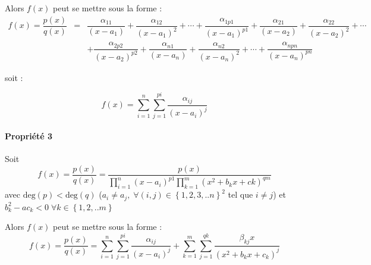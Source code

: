 \documentclass[10pt,fleqn]{article} %
\begin{document}
Alors $f(x)$ peut se mettre sous la forme :
$$
\begin{array}{lll}
f(x)=\dfrac{p(x)}{q(x)}&=&
\dfrac{\alpha_{11}}{\left(x-a_1 \right)}
+\dfrac{\alpha_{12}}{\left(x-a_1 \right)^2}
+\cdots
+\dfrac{\alpha_{1p1}}{\left(x-a_1 \right)^{p1}}
+\dfrac{\alpha_{21}}{\left(x-a_2 \right)}
+\dfrac{\alpha_{22}}{\left(x-a_2 \right)^{2}}
+\cdots \\
&&
+\dfrac{\alpha_{2p2}}{\left(x-a_2 \right)^{p2}}
+\dfrac{\alpha_{n1}}{\left(x-a_n \right)}
+\dfrac{\alpha_{n2}}{\left(x-a_n \right)^{2}}
+\cdots
+\dfrac{\alpha_{npn}}{\left(x-a_n \right)^{pn}}
\end{array}
$$

soit : 

$$
f(x)=\sum\limits_{i=1}^n \sum\limits_{j=1}^{pi}
\dfrac{\alpha_{ij}}{\left(x-a_i\right)^j}
$$
\paragraph*{Propriété 3}
Soit
$$
f(x)=\dfrac{p(x)}{q(x)}=
\dfrac{p(x)}{
\prod\limits_{i=1}^{n} \left(x-a_i \right)^{p1}
\prod\limits_{k=1}^{m} \left(x^2+b_kx+ck \right)^{qm}
}
$$
avec $\text{deg}(p)<\text{deg}(q)$ ($a_i\neq a_j,\; \forall (i,j) \in \left\{1,2,3,..n
\right\}^2$ tel que $i\neq j$) et $b^2_k-ac_k<0 \; \forall k \in\left\{1,2,..m
\right\}$ 

Alors $f(x)$ peut se mettre sous la forme :
$$
f(x)=\dfrac{p(x)}{q(x)}=
\sum\limits_{i=1}^n \sum\limits_{j=1}^{pi}
\dfrac{\alpha_{ij}}{\left(x-a_i\right)^j}
+
\sum\limits_{k=1}^m \sum\limits_{j=1}^{qk}
\dfrac{\beta_{kj}x}{\left(x^2+b_kx+c_k\right)^j}
$$
\end{document}
